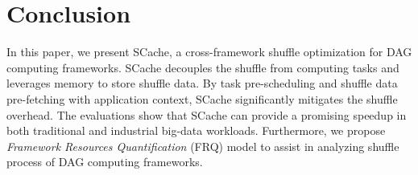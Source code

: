 \section{Conclusion}\label{conclusion}
In this paper, we present SCache, a cross-framework shuffle optimization for DAG computing frameworks. 
SCache decouples the shuffle from computing tasks and leverages memory to store shuffle data. 
By task pre-scheduling and shuffle data pre-fetching with application context, SCache significantly mitigates the shuffle overhead. 
{\color{black}
The evaluations show that SCache can provide a promising speedup in both traditional and industrial big-data workloads. 
Furthermore, we propose \textit{Framework Resources Quantification} (FRQ) model to assist in analyzing shuffle process of DAG computing frameworks. 
}
